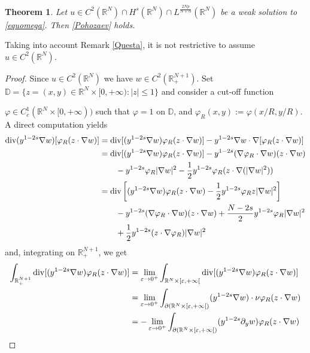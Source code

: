 \documentclass[10pt]{amsart}
\numberwithin{equation}{section}
\newtheorem{theorem}{Theorem}[section]
\begin{document}
\begin{theorem}
\label{pohoz}
Let $u \in C^2({{\mathbb R}}^N)\cap H^s(\mathbb{R}^N)\cap L^{\frac{2Np}{N+\alpha}}({{\mathbb R}}^N)$ be a weak solution to \eqref{equomega}.
Then \eqref{Pohozaev} holds. 
\end{theorem}
\noindent Taking into account Remark \ref{Questa},  it is not restrictive to assume  $u\in C^{2}(\mathbb R^{N})$.
\begin{proof}
	Since $u\in C^2({{\mathbb R}}^N)$ we have $w\in C^2({{\mathbb R}}^{N+1}_+)$. Set 
	${{\mathbb D}}=\{z=(x,y)\in {{\mathbb R}}^N\times [0,+\infty):|z|\leq  1\}$ and consider a cut-off function
	
	$\varphi\in C^1_c({{\mathbb R}}^{N}\times [0,+\infty))$ such that $\varphi=1$ on ${{\mathbb D}}$, and $\varphi_{R}(x,y):=\varphi(x/R,y/R)$.
	A direct computation yields
	\begin{align*}
	{\rm div}(y^{1-2s}\nabla w)[\varphi_{R}(z\cdot\nabla w)]
	&=
	{\rm div}[(y^{1-2s}\nabla w)\varphi_{R}(z\cdot\nabla w)]
	-y^{1-2s}\nabla w\cdot \nabla [\varphi_{R}(z\cdot\nabla w)]\\
	&=
	{\rm div}[(y^{1-2s}\nabla w)\varphi_{R}(z\cdot\nabla w)]
	-y^{1-2s}(\nabla\varphi_{R}\cdot\nabla w)(z\cdot\nabla w)\\
	&\qquad
	-y^{1-2s} \varphi_{R} |\nabla w|^2
	-\frac{1}{2}y^{1-2s} \varphi_{R} (z\cdot\nabla(|\nabla w|^2))\\
	&=
	{\rm div}\left[
	(y^{1-2s}\nabla w)\varphi_{R}(z\cdot\nabla w)
	-\frac{1}{2}y^{1-2s}\varphi_{R}z|\nabla w|^2
	\right]\\
	&\qquad
	-y^{1-2s}(\nabla\varphi_{R}\cdot\nabla w)(z\cdot\nabla w)
	+\frac{N-2s}{2}y^{1-2s} \varphi_{R} |\nabla w|^2\\
	&\qquad
	+\frac{1}{2}y^{1-2s}(z\cdot\nabla\varphi_{R})|\nabla w|^2
	\end{align*}
	and, integrating on ${{\mathbb R}}_+^{N+1}$, we get
	\begin{align*}
	\int_{{{\mathbb R}}_+^{N+1}}
	{\rm div}[
	(y^{1-2s}\nabla w)\varphi_{R}(z\cdot\nabla w)
	]
	&=
	\lim_{{\varepsilon}\to 0^+} \int_{{{\mathbb R}}^N\times[{\varepsilon},+\infty[}	{\rm div}[
	(y^{1-2s}\nabla w)\varphi_{R}(z\cdot\nabla w)]\\
	&=
	\lim_{{\varepsilon}\to 0^+}
	\int_{\partial({{\mathbb R}}^N\times[{\varepsilon},+\infty[)} (y^{1-2s}\nabla w)\cdot \nu\varphi_{R}(z\cdot\nabla w)\\
	&=
	-\lim_{{\varepsilon}\to 0^+}
	\int_{\partial({{\mathbb R}}^N\times[{\varepsilon},+\infty[)} (y^{1-2s} \partial_y w)\varphi_{R}(z\cdot\nabla w)\\

\end{align*}
\end{proof}
\end{document}
